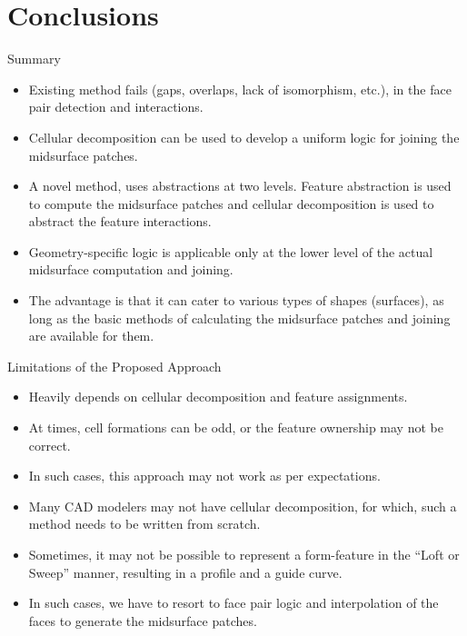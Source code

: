 \section{Conclusions}

\begin{frame}{Summary}
\begin{itemize}[noitemsep,label=\textbullet, topsep=2pt,parsep=2pt,partopsep=2pt]
\item  Existing method fails (gaps, overlaps, lack of isomorphism, etc.), in the face pair detection and interactions. 
\item Cellular decomposition can be used to develop a uniform logic for joining the midsurface patches.
\item A novel method, uses abstractions at two levels. Feature abstraction is used to compute the midsurface patches and cellular decomposition  is used to abstract the feature interactions. \item Geometry-specific logic  is applicable only at the lower level of the actual midsurface computation and joining. 
\item The advantage is that it can cater to various types of shapes (surfaces), as long as the basic methods of calculating the midsurface patches and joining are available for them.
\end{itemize}
\end{frame}


\begin{frame}{Limitations of the Proposed Approach}
\begin{itemize}[noitemsep,label=\textbullet, topsep=2pt,parsep=2pt,partopsep=2pt]
\item Heavily depends on cellular decomposition and feature assignments. 
\item At times, cell formations can be odd, or the feature ownership may not be correct. 
\item In such cases, this approach may not work as per expectations. 
\item Many CAD modelers may not have cellular decomposition, for which, such a method needs to be written from scratch.  
\item Sometimes, it may not be possible to represent a form-feature in the ``Loft or Sweep'' manner, resulting in a profile and a guide curve. 
\item In such cases, we have to resort to face pair logic and interpolation of the faces to generate the midsurface patches.
\end{itemize}
\end{frame}

